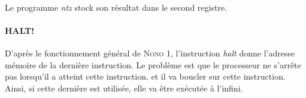 \paragraph{}{
	Le programme \textit{ntz} stock son résultat dans le second registre.
}

\paragraph{HALT!}{
	D'après le fonctionnement général de \textsc{Nono 1}, l’instruction \textit{halt} donne l'adresse
	mémoire de la dernière instruction. Le problème est que le processeur ne 
	s’arrête pas lorsqu'il a atteint cette instruction. et il va boucler sur cette 
	instruction. Ainsi, si cette dernière est utilisée, elle va être exécutée à l'infini. 
}